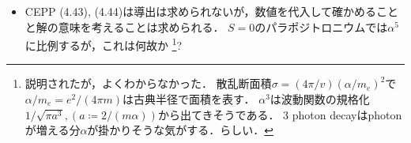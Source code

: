 \begin{itemize}
		\item CEPP (4.43), (4.44)は導出は求められないが，数値を代入して確かめることと解の意味を考えることは求められる．
		$S=0 $のパラポジトロニウムでは$\alpha^5 $に比例するが，これは何故か
		\footnote{
				説明されたが，よくわからなかった．
				散乱断面積$\sigma = (4\pi/v)(\alpha/m_{e})^2$で$\alpha/m_e = e^2/(4\pi m) $は古典半径で面積を表す．
				$\alpha^3 $は波動関数の規格化$1/\sqrt{\pi a^3}, (a\coloneqq 2/(m\alpha)) $から出てきそうである．
				3 photon decayはphotonが増える分$\alpha $が掛かりそうな気がする．らしい．
		}?
\end{itemize}
